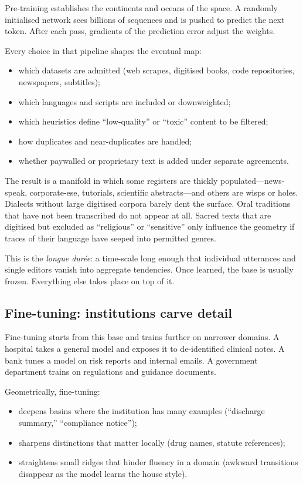 \documentclass[12pt,a4paper]{book}
\begin{document}
Pre-training establishes the continents and oceans of the space. A randomly initialised network sees billions of sequences and is pushed to predict the next token. After each pass, gradients of the prediction error adjust the weights.

Every choice in that pipeline shapes the eventual map:

\begin{itemize}
  \item which datasets are admitted (web scrapes, digitised books, code repositories, newspapers, subtitles);
  \item which languages and scripts are included or downweighted;
  \item which heuristics define ``low-quality'' or ``toxic'' content to be filtered;
  \item how duplicates and near-duplicates are handled;
  \item whether paywalled or proprietary text is added under separate agreements.
\end{itemize}

The result is a manifold in which some registers are thickly populated---news-speak, corporate-ese, tutorials, scientific abstracts---and others are wisps or holes. Dialects without large digitised corpora barely dent the surface. Oral traditions that have not been transcribed do not appear at all. Sacred texts that are digitised but excluded as ``religious'' or ``sensitive'' only influence the geometry if traces of their language have seeped into permitted genres.

This is the \emph{longue dur\'{e}e}: a time-scale long enough that individual utterances and single editors vanish into aggregate tendencies. Once learned, the base is usually frozen. Everything else takes place on top of it.

\subsection*{Fine-tuning: institutions carve detail}

Fine-tuning starts from this base and trains further on narrower domains. A hospital takes a general model and exposes it to de-identified clinical notes. A bank tunes a model on risk reports and internal emails. A government department trains on regulations and guidance documents.

Geometrically, fine-tuning:

\begin{itemize}
  \item deepens basins where the institution has many examples (``discharge summary,'' ``compliance notice'');
  \item sharpens distinctions that matter locally (drug names, statute references);
  \item straightens small ridges that hinder fluency in a domain (awkward transitions disappear as the model learns the house style).
\end{itemize}
\end{document}

